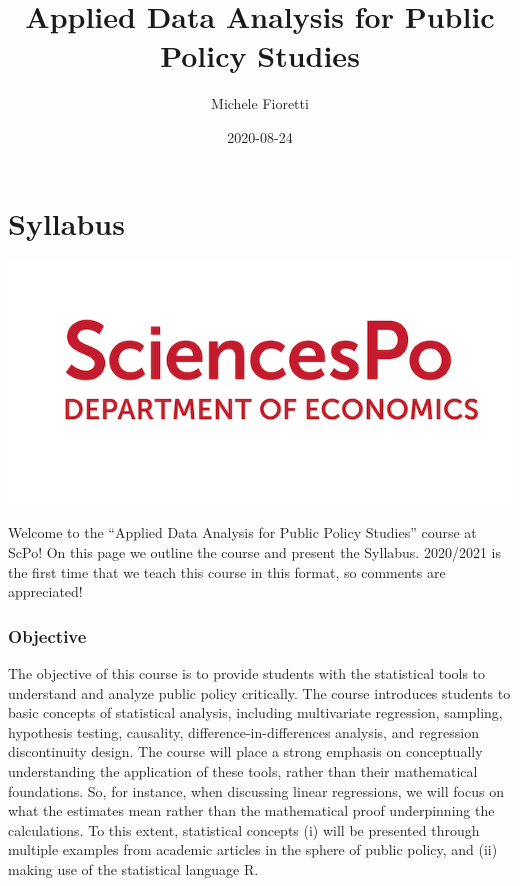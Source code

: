 \documentclass[]{book}
\title{Applied Data Analysis for Public Policy Studies}
\author{Michele Fioretti}
\date{2020-08-24}
\begin{document}
\maketitle

{
\setcounter{tocdepth}{1}
\tableofcontents
}
\hypertarget{syllabus}{%
\chapter*{Syllabus}\label{syllabus}}

\includegraphics{ScPo.jpg}

Welcome to the ``Applied Data Analysis for Public Policy Studies'' course at ScPo! On this page we outline the course and present the Syllabus. 2020/2021 is the first time that we teach this course in this format, so comments are appreciated!

\hypertarget{objective}{%
\subsection*{Objective}\label{objective}}

The objective of this course is to provide students with the statistical tools to understand and analyze public policy critically. The course introduces students to basic concepts of statistical analysis, including multivariate regression, sampling, hypothesis testing, causality, difference-in-differences analysis, and regression discontinuity design. The course will place a strong emphasis on conceptually understanding the application of these tools, rather than their mathematical foundations. So, for instance, when discussing linear regressions, we will focus on what the estimates mean rather than the mathematical proof underpinning the calculations. To this extent, statistical concepts (i) will be presented through multiple examples from academic articles in the sphere of public policy, and (ii) making use of the statistical language R.
\end{document}
